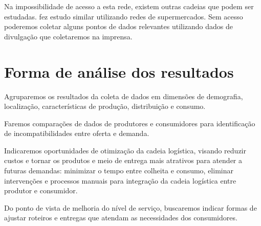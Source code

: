 \documentclass[
	12pt,				%
	openright,			%
	oneside,			%
	a4paper,			%
	english,			%
	french,				%
	spanish,			%
	brazil,				%
	]{abntex2}
\begin{document}
Na impossibilidade de acesso a esta rede, existem outras cadeias que podem ser estudadas.  fez estudo similar utilizando redes de supermercados. Sem acesso poderemos coletar alguns pontos de dados relevantes utilizando dados de divulgação que coletaremos na imprensa.

\chapter{Forma de análise dos resultados}

Agruparemos os resultados da coleta de dados em dimensões de demografia, localização, características de produção, distribuição e consumo.

Faremos comparações de dados de produtores e consumidores para identificação de incompatibilidades entre oferta e demanda.

Indicaremos oportunidades de otimização da cadeia logística, visando reduzir custos e tornar os produtos e meio de entrega mais atrativos para atender a futuras demandas: minimizar o tempo entre colheita e consumo, eliminar intervenções e processos manuais para integração da cadeia logística entre produtor e consumidor.

Do ponto de vista de melhoria do nível de serviço, buscaremos indicar formas de ajustar roteiros e entregas que atendam as necessidades dos consumidores.



\end{document}
